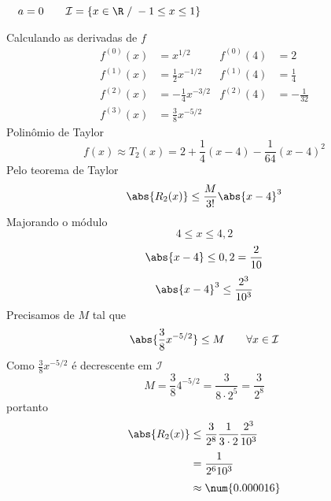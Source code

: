 \begin{exercises}
\begin{exercise}
\begin{mathlist}
		\(
			\quad a = 0 \qquad
			\mathcal{I} =\{x\in\R\;/\;-1  \leq x \leq 1 \}
		\)
	\end{mathlist}
	\begin{answer}
		\begin{alphalist}
			\item Calculando as derivadas de $f$
			\begin{align*}
				f^{(0)}(x) & =              x^{ 1/2} & f^{(0)}(4) & = 2             \\
				f^{(1)}(x) & =  \frac{1}{2} x^{-1/2} & f^{(1)}(4) & =  \frac{1}{4}  \\
				f^{(2)}(x) & = -\frac{1}{4} x^{-3/2} & f^{(2)}(4) & = -\frac{1}{32} \\
				f^{(3)}(x) & =  \frac{3}{8} x^{-5/2} &
			\end{align*}
			Polinômio de Taylor
			\[ f(x) \approx T_2(x) = 2 + \frac{1}{4}(x-4) -\frac{1}{64}(x-4)^2 \]
			Pelo teorema de Taylor
			\[ \abs{R_2(x)} \leq \frac{M}{3!}\abs{x-4}^3 \]
			Majorando o módulo
			\[ 4 \leq x \leq 4,2 \]
			\[ \abs{x-4} \leq 0,2 = \frac{2}{10} \]
			\[ \abs{x-4}^3 \leq \frac{2^3}{10^3} \]
			Precisamos de $M$ tal que
			\[ \abs{\frac{3}{8} x^{-5/2}} \leq M \qquad \forall x\in \mathcal{I} \]
			Como \(\frac{3}{8} x^{-5/2}\) é decrescente em $\mathcal{I}$
			\[ M = \frac{3}{8} 4^{-5/2} = \frac{3}{8\cdot 2^5} = \frac{3}{2^8} \]
			portanto
			\begin{align*}
				\abs{R_2(x)} & \leq \frac{3}{2^8} \frac{1}{3\cdot 2} \frac{2^3}{10^3} \\[1mm]
				& = \frac{1}{2^6 10^3}                                    \\[1mm]
				& \approx \num{0.000016}
			\end{align*}


\end{alphalist}
\end{answer}
\end{exercise}
\end{exercises}
